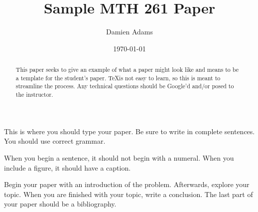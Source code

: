 \documentclass[11pt]{article}
\title{Sample MTH 261 Paper}
\author{Damien Adams}
\date{\today}
\affil{Portland Community College}
\begin{document}

\maketitle


\begin{abstract}

This paper seeks to give an example of what a paper might look like and means to be a template for the student's paper. \TeX is not easy to learn, so this is meant to streamline the process. Any technical questions should be Google'd and/or posed to the instructor.
 
\end{abstract}


This is where you should type your paper. Be sure to write in complete sentences. You should use correct grammar.

When you begin a sentence, it should not begin with a numeral. When you include a figure, it should have a caption.

Begin your paper with an introduction of the problem. Afterwards, explore your topic. When you are finished with your topic, write a conclusion. The last part of your paper should be a bibliography.






\begin{bibdiv}
\begin{biblist}


 
 
\end{biblist}
\end{bibdiv}

\end{document}
